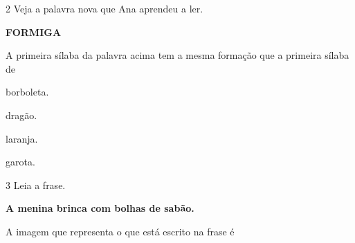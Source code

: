 \vspace*{+1em}

\num{2} Veja a palavra nova que Ana aprendeu a ler.

\vspace*{+1em}

\begin{myquote}
\centering
\textbf{FORMIGA}
\end{myquote}

A primeira sílaba da palavra acima tem a mesma formação que a 
primeira sílaba de

\begin{escolha}
\item borboleta.

\item dragão.

\item laranja.

\item garota.
\end{escolha}

\pagebreak

\num{3} Leia a frase.

\begin{myquote}
\centering
\textbf{A menina brinca com bolhas de sabão.}
\end{myquote}

A imagem que representa o que está escrito na frase é

